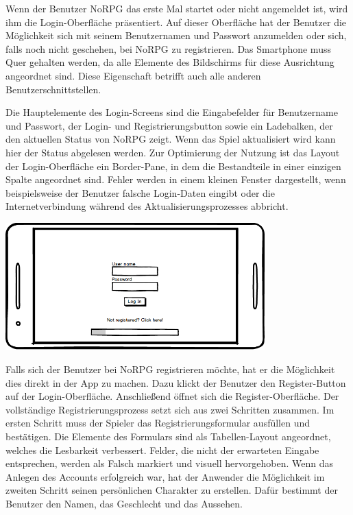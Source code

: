 			Wenn der Benutzer NoRPG das erste Mal startet oder nicht angemeldet ist, wird ihm die Login-Oberfläche präsentiert. Auf dieser Oberfläche hat der Benutzer die Möglichkeit sich mit seinem Benutzernamen und  Passwort anzumelden oder sich, falls noch nicht geschehen, bei NoRPG zu registrieren. Das Smartphone muss Quer gehalten werden, da alle Elemente des Bildschirms für diese Ausrichtung angeordnet sind. Diese Eigenschaft betrifft auch alle anderen Benutzerschnittstellen.  
			
			Die Hauptelemente des Login-Screens sind die Eingabefelder für Benutzername und Passwort, der Login- und Registrierungsbutton sowie ein Ladebalken, der den aktuellen Status von NoRPG zeigt. Wenn das Spiel aktualisiert wird kann hier der Status abgelesen werden. Zur Optimierung der Nutzung ist das Layout der Login-Oberfläche ein Border-Pane, in dem die Bestandteile in einer einzigen Spalte angeordnet sind. Fehler werden in einem kleinen Fenster dargestellt, wenn beispielsweise der Benutzer falsche Login-Daten eingibt oder die Internetverbindung während des Aktualisierungsprozesses abbricht.
			
			\begin{center}
				\includegraphics[width=10cm]{pics/Login.png}
			\end{center}
			
			Falls sich der Benutzer bei NoRPG registrieren möchte, hat er die Möglichkeit dies direkt in der App zu machen. Dazu klickt der Benutzer den Register-Button auf der Login-Oberfläche. Anschließend öffnet sich die Register-Oberfläche. Der vollständige Registrierungsprozess setzt sich aus zwei Schritten zusammen. Im ersten Schritt muss der Spieler das Registrierungsformular ausfüllen und bestätigen. Die Elemente des Formulars sind als Tabellen-Layout angeordnet, welches die Lesbarkeit verbessert. Felder, die nicht der erwarteten Eingabe entsprechen, werden als Falsch markiert und visuell hervorgehoben. Wenn das Anlegen des Accounts erfolgreich war, hat der Anwender die Möglichkeit im zweiten Schritt seinen persönlichen Charakter zu erstellen. Dafür bestimmt der Benutzer den Namen, das Geschlecht und das Aussehen.
			
